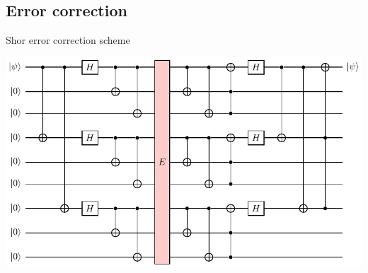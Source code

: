 \subsection{Error correction}
	\begin{frame}{Shor error correction scheme}
	\begin{center}
	\includegraphics[height=0.6\textheight]{pics/shorcode.pdf}\\
	\end{center}
\end{frame}